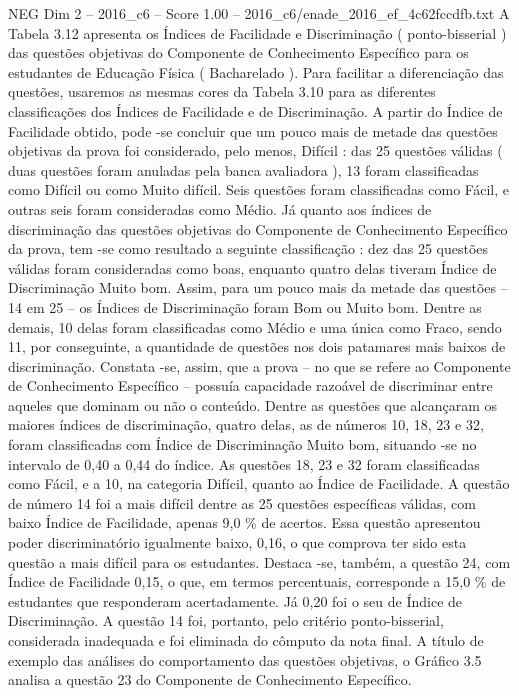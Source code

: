 \begin{textsample}{NEG Dim 2 – 2016\_c6 – Score 1.00 – 2016\_c6/enade\_2016\_ef\_4c62fccdfb.txt}
A Tabela 3.12 apresenta os Índices de Facilidade e Discriminação ( ponto-bisserial ) das questões objetivas do Componente de Conhecimento Específico para os estudantes de Educação Física ( Bacharelado ).
Para facilitar a diferenciação das questões, usaremos as mesmas cores da Tabela 3.10 para as diferentes classificações dos Índices de Facilidade e de Discriminação.
A partir do Índice de Facilidade obtido, pode -se concluir que um pouco mais de metade das questões objetivas da prova foi considerado, pelo menos, Difícil : das 25 questões válidas ( duas questões foram anuladas pela banca avaliadora ), 13 foram classificadas como Difícil ou como Muito difícil.
Seis questões foram classificadas como Fácil, e outras seis foram consideradas como Médio.
Já quanto aos índices de discriminação das questões objetivas do Componente de Conhecimento Específico da prova, tem -se como resultado a seguinte classificação : dez das 25 questões válidas foram consideradas como boas, enquanto quatro delas tiveram Índice de Discriminação Muito bom.
Assim, para um pouco mais da metade das questões – 14 em 25 – os Índices de Discriminação foram Bom ou Muito bom.
Dentre as demais, 10 delas foram classificadas como Médio e uma única como Fraco, sendo 11, por conseguinte, a quantidade de questões nos dois patamares mais baixos de discriminação.
Constata -se, assim, que a prova – no que se refere ao Componente de Conhecimento Específico – possuía capacidade razoável de discriminar entre aqueles que dominam ou não o conteúdo.
Dentre as questões que alcançaram os maiores índices de discriminação, quatro delas, as de números 10, 18, 23 e 32, foram classificadas com Índice de Discriminação Muito bom, situando -se no intervalo de 0,40 a 0,44 do índice.
As questões 18, 23 e 32 foram classificadas como Fácil, e a 10, na categoria Difícil, quanto ao Índice de Facilidade.
A questão de número 14 foi a mais difícil dentre as 25 questões específicas válidas, com baixo Índice de Facilidade, apenas 9,0 \% de acertos.
Essa questão apresentou poder discriminatório igualmente baixo, 0,16, o que comprova ter sido esta questão a mais difícil para os estudantes.
Destaca -se, também, a questão 24, com Índice de Facilidade 0,15, o que, em termos percentuais, corresponde a 15,0 \% de estudantes que responderam acertadamente.
Já 0,20 foi o seu de Índice de Discriminação.
A questão 14 foi, portanto, pelo critério ponto-bisserial, considerada inadequada e foi eliminada do cômputo da nota final.
A título de exemplo das análises do comportamento das questões objetivas, o Gráfico 3.5 analisa a questão 23 do Componente de Conhecimento Específico.

\end{textsample}
